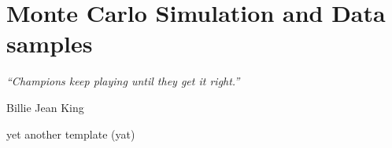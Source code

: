 \chapter{Monte Carlo Simulation and Data samples}
\label{ch:data_mc}
\epigraph{\emph{“Champions keep playing until they get it right.”}}{Billie Jean King}

yet another template (yat)